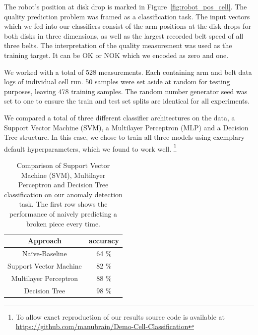 \documentclass[5p,times,procedia]{elsarticle}
\begin{document}
The robot's position at disk drop is marked in 
Figure~\ref{fig:robot_pos_cell}. The quality prediction problem was 
framed as a classification task. The input vectors which we fed into our
classifiers consist of the arm positions at the disk drops for both
disks in three dimensions, as well as the largest recorded belt speed
of all three belts. The interpretation of the quality measurement was 
used as the training target. It can be OK or NOK which we encoded as 
zero and one.

We worked with a total of 528 measurements. Each containing arm and belt data
logs of individual cell run. 50 samples were set aside at random for testing 
purposes, leaving 478 training samples. The random number generator seed was
set to one to ensure the train and test set splits are identical 
for all experiments.

We compared a total of three different classifier architectures on the data,
a Support Vector Machine (SVM), a Multilayer Perceptron (MLP) and a Decision Tree
structure. In this case, we chose to train all three models using exemplary 
default hyperparameters, which we found to work well.
\footnote{To allow exact reproduction of our results source code
 is available at \url{https://github.com/manubrain/Demo-Cell-Classification}}

\begin{table}
       \centering
       \begin{tabular}{ c c } \toprule
              Approach         & accuracy \\ \midrule
              Na\"ive-Baseline & 64 \% \\
              Support Vector Machine & 82 \% \\
              Multilayer Perceptron & 88 \% \\
              Decision Tree         & 98 \% \\ \bottomrule
       \end{tabular}
       \caption{Comparison of Support Vector Machine (SVM), Multilayer Perceptron and 
                Decision Tree classification on our anomaly detection task. 
                The first row shows the performance of naively predicting a broken piece
                every time.}
       \label{tab:class_comp}
\end{table}
\end{document}
